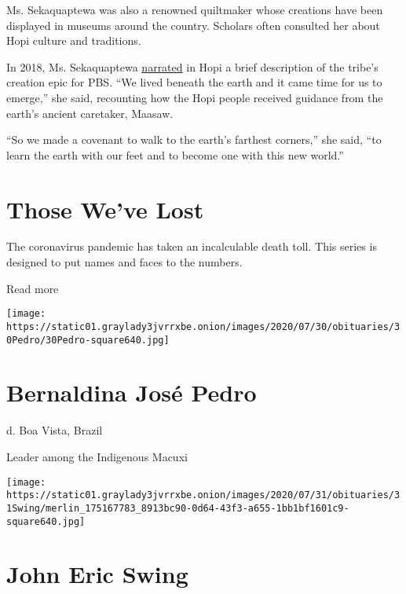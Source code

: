 Ms. Sekaquaptewa was also a renowned quiltmaker whose creations have
been displayed in museums around the country. Scholars often consulted
her about Hopi culture and traditions.

In 2018, Ms. Sekaquaptewa
\href{https://www.pbs.org/video/hopi-origin-story-dc0awe/}{narrated} in
Hopi a brief description of the tribe's creation epic for PBS. ``We
lived beneath the earth and it came time for us to emerge,'' she said,
recounting how the Hopi people received guidance from the earth's
ancient caretaker, Maasaw.

``So we made a covenant to walk to the earth's farthest corners,'' she
said, ``to learn the earth with our feet and to become one with this new
world.''

\href{https://www.nytimes3xbfgragh.onion/interactive/2020/obituaries/people-died-coronavirus-obituaries.html?action=click\&pgtype=Article\&state=default\&region=BELOW_MAIN_CONTENT\&context=covid_obits_promo}{}

\hypertarget{those-weve-lost}{%
\section{Those We've Lost}\label{those-weve-lost}}

The coronavirus pandemic has taken an incalculable death toll. This
series is designed to put names and faces to the numbers.

Read more

\texttt{[image: https://static01.graylady3jvrrxbe.onion/images/2020/07/30/obituaries/30Pedro/30Pedro-square640.jpg]}

\hypertarget{bernaldina-josuxe9-pedro}{%
\section{Bernaldina José Pedro}\label{bernaldina-josuxe9-pedro}}

d. Boa Vista, Brazil

Leader among the Indigenous Macuxi

\texttt{[image: https://static01.graylady3jvrrxbe.onion/images/2020/07/31/obituaries/31Swing/merlin\_175167783\_8913bc90-0d64-43f3-a655-1bb1bf1601c9-square640.jpg]}

\hypertarget{john-eric-swing}{%
\section{John Eric Swing}\label{john-eric-swing}}

